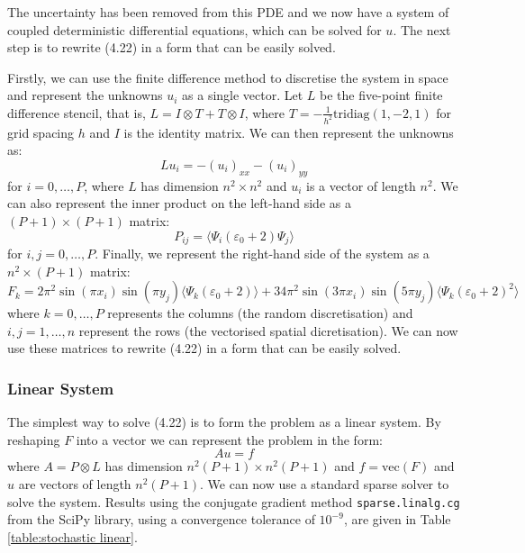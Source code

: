 \documentclass[11pt]{article}
\numberwithin{equation}{section}
\begin{document}
The uncertainty has been removed from this PDE and we now have a system of coupled deterministic differential equations, which can be solved for $u$. The next step is to rewrite (4.22) in a form that can be easily solved.

Firstly, we can use the finite difference method to discretise the system in space and represent the unknowns $u_i$ as a single vector. Let $L$ be the five-point finite difference stencil, that is, $L= I \otimes T + T \otimes I$, where $T=-\frac{1}{h^2} \text{tridiag}(1,-2,1)$ for grid spacing $h$ and $I$ is the identity matrix. We can then represent the unknowns as:
\begin{equation}
Lu_i = - (u_i)_{xx} - (u_i)_{yy}
\end{equation}
for $i=0,\dots,P$, where $L$ has dimension $n^2 \times n^2$ and $u_i$ is a vector of length $n^2$. We can also represent the inner product on the left-hand side as a $(P+1) \times (P+1)$ matrix:
\begin{equation}
P_{ij} = \langle \Psi_i (\varepsilon_0 + 2) \Psi_j \rangle
\end{equation}
for $i,j = 0,\dots,P$. Finally, we represent the right-hand side of the system as a $n^2 \times (P+1)$ matrix:
\begin{equation}
F_{k} = 2\pi^2 \sin(\pi x_i)\sin(\pi y_j) \langle \Psi_k (\varepsilon_0 + 2) \rangle + 34\pi^2 \sin(3\pi x_i) \sin(5\pi y_j) \langle \Psi_k (\varepsilon_0 + 2)^2 \rangle
\end{equation}
where $k = 0, \dots, P$ represents the columns (the random discretisation) and $i,j = 1, \dots, n$ represent the rows (the vectorised spatial dicretisation). We can now use these matrices to rewrite (4.22) in a form that can be easily solved.

\subsubsection*{Linear System}
The simplest way to solve (4.22) is to form the problem as a linear system. By reshaping $F$ into a vector we can represent the problem in the form:
\begin{equation}
Au = f
\end{equation} 
where $A = P \otimes L$ has dimension $n^2(P+1) \times n^2(P+1)$ and $f = \text{vec}(F)$ and $u$ are vectors of length $n^2(P+1)$. We can now use a standard sparse solver to solve the system. Results using the conjugate gradient method \texttt{sparse.linalg.cg} from the SciPy library, using a convergence tolerance of $10^{-9}$, are given in Table \ref{table:stochastic linear}.
\end{document}
